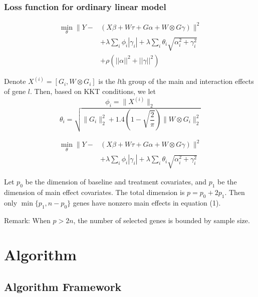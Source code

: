 \documentclass{beamer}
\begin{document}
\begin{frame}
\frametitle{Loss function for ordinary linear model}

\begin{equation}
\begin{split}
\min_{\theta} \parallel Y- & (X\beta + W\tau + G\alpha + W\otimes G \gamma) \parallel^2 \\
& + \lambda \sum_i \phi_i |\gamma_i| + \lambda \sum_i \theta_i \sqrt{\alpha_i^2 + \gamma_i^2} \\
& +\rho(||\alpha||^2+||\gamma||^2)
\end{split}
\end{equation}

Denote $X^{(i)}=[G_i,W\otimes G_i]$ is the $l$th group of the main and interaction effects of gene $l$.
Then, based on KKT conditions,  we let $$\phi_i= \parallel X^{(i)}\parallel_2$$ 
$$\theta_i=\sqrt{\parallel G_i\parallel_2^2+1.4(1-\sqrt{\frac{2}{\pi}}) \parallel W\otimes G_i\parallel_2^2}$$
\end{frame}

\begin{frame}

\begin{equation}
\begin{split}
\min_{\theta} \parallel Y- & (X\beta + W\tau + G\alpha + W\otimes G \gamma) \parallel^2 \\
& + \lambda \sum_i \phi_i |\gamma_i| + \lambda \sum_i \theta_i \sqrt{\alpha_i^2 + \gamma_i^2} 
\end{split}
\end{equation}

        \begin{theorem}
 Let $p_0$ be the dimension of baseline and treatment covariates, and $p_1$ be the dimension of main effect covariates.
The total dimension is $p=p_0+2p_1$. Then only $\min\{p_1,n-p_0\}$ genes have nonzero main effects in equation (1).
        \end{theorem} 
        Remark: When $p>2n$, the number of selected genes is bounded by sample size.

\end{frame}


\section{Algorithm}

\subsection{Algorithm Framework}
\end{document}
